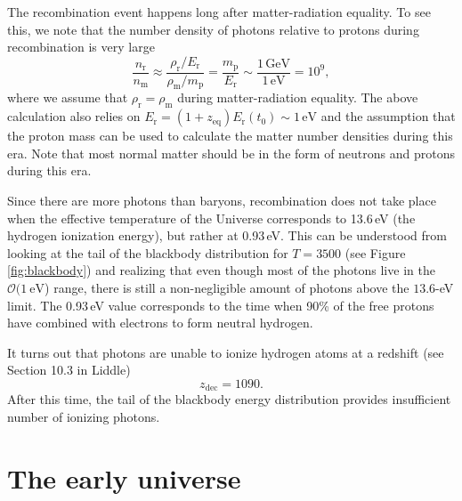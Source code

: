 \documentclass[a4paper,12pt]{article}
\theoremstyle{remark}
\newcommand{\mrm}[1]{\mathrm{#1}}
\renewcommand{\=}[1]{\stackrel{#1}{=}} %
\theoremstyle{plain}
\theoremstyle{definition}
\begin{document}
The recombination event happens long after matter-radiation equality. To see this, we note that the number density of photons relative to protons during recombination is very large
\begin{equation}
\frac{n_\mrm{r}}{n_\mrm{m}} \approx \frac{\rho _\mrm{r}/E_\mrm{r}}{\rho _\mrm{m} / m_\mrm{p}} = \frac{m_\mrm{p}}{E_\mrm{r}} \sim \frac{1\,\mrm{GeV}}{1\,\mrm{eV}} = 10^9,
\end{equation}
where we assume that $\rho _\mrm{r} = \rho _\mrm{m}$ during matter-radiation equality. The above calculation also relies on $E_\mrm{r} = (1+z_\mrm{eq})E_\mrm{r}(t_0) \sim 1\,\mrm{eV}$ and the assumption that the proton mass can be used to calculate the matter number densities during this era. Note that most normal matter should be in the form of neutrons and protons during this era.

Since there are more photons than baryons, recombination does not take place when the effective temperature of the Universe corresponds to 13.6\,eV (the hydrogen ionization energy), but rather at 0.93\,eV. This can be understood from looking at the tail of the blackbody distribution for $T=3500$ (see Figure \ref{fig:blackbody}) and realizing that even though most of the photons live in the $\mathcal{O}(1 \:\mrm{eV}$) range, there is still a non-negligible amount of photons above the $13.6$-eV limit. The 0.93\,eV value corresponds to the time when 90\% of the free protons have combined with electrons to form neutral hydrogen. 

It turns out that photons are unable to ionize hydrogen atoms at a redshift (see Section 10.3 in Liddle)
\begin{equation}
z_\mrm{dec} = 1090.
\end{equation}
After this time, the tail of the blackbody energy distribution provides insufficient number of ionizing photons. 

\section{The early universe}
\end{document}
